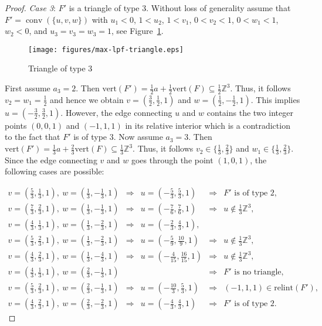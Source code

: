 \documentclass[a4paper]{article}
\theoremstyle{plain}
\begin{document}
\begin{proof}
\emph{Case 3}: $F'$ is a triangle of type 3.
Without loss of generality assume that $F' =
{{\mathop{\mathrm{{conv}}}}}(\{u,v,w\})$ with $u_1 < 0$, $1 < u_2$, $1 < v_1$, $0 <
v_2 < 1$, $0 < w_1 < 1$, $w_2 < 0$, and $u_3 = v_3 = w_3 =
1$, see Figure~\ref{fig.mlpf.tria}.
\begin{figure}[ht]
  \centering
  \texttt{[image: figures/max-lpf-triangle.eps]}
  \caption{Triangle of type $3$}
  \label{fig.mlpf.tria}
\end{figure}
First assume $a_3 = 2$.
Then ${\mathrm{vert}}(F') = \frac{1}{2}a + \frac{1}{2}{\mathrm{vert}}(F)
\subseteq \frac{1}{2} {\mathbb{Z}}^3$.
Thus, it follows $v_2 = w_1 = \frac{1}{2}$ and hence we
obtain $v = (\frac{3}{2},\frac{1}{2},1)$ and $w =
(\frac{1}{2},-\frac{1}{2},1)$.
This implies $u = (-\frac{3}{2},\frac{3}{2},1)$.
However, the edge connecting $u$ and $w$ contains the two
integer points $(0,0,1)$ and $(-1,1,1)$ in its relative
interior which is a contradiction to the fact that $F'$ is
of type $3$.
Now assume $a_3 = 3$.
Then ${\mathrm{vert}}(F') = \frac{1}{3}a + \frac{2}{3}{\mathrm{vert}}(F)
\subseteq \frac{1}{3} {\mathbb{Z}}^3$.
Thus, it follows $v_2 \in \{\frac{1}{3},\frac{2}{3}\}$ and
$w_1 \in \{\frac{1}{3},\frac{2}{3}\}$.
Since the edge connecting $v$ and $w$ goes through the point
$(1,0,1)$, the following cases are possible:
\medskip

$ \begin{array}{lllll}
  v = (\frac{5}{3},\frac{1}{3},1),\ w = (\frac{1}{3},-\frac{1}{3},1)
  & \Longrightarrow & u = (-\frac{5}{3},\frac{5}{3},1)
  & \Longrightarrow & F' \mbox{ is of type 2}, \\[2mm]
  v = (\frac{7}{3},\frac{2}{3},1),\ w = (\frac{1}{3},-\frac{1}{3},1)
  & \Longrightarrow & u = (-\frac{7}{6},\frac{7}{6},1)
  & \Longrightarrow & u \not \in \frac{1}{3} {\mathbb{Z}}^3, \\[2mm]
  v = (\frac{4}{3},\frac{1}{3},1),\ w = (\frac{1}{3},-\frac{2}{3},1)
  & \Longrightarrow & u = (-\frac{2}{3},\frac{4}{3},1),
  & & \\[2mm]
  v = (\frac{5}{3},\frac{2}{3},1),\ w = (\frac{1}{3},-\frac{2}{3},1)
  & \Longrightarrow & u = (-\frac{5}{9},\frac{10}{9},1)
  & \Longrightarrow & u \not \in \frac{1}{3} {\mathbb{Z}}^3, \\[2mm]
  v = (\frac{4}{3},\frac{2}{3},1),\ w = (\frac{1}{3},-\frac{4}{3},1)
  & \Longrightarrow & u = (-\frac{4}{15},\frac{16}{15},1)
  & \Longrightarrow & u \not \in \frac{1}{3} {\mathbb{Z}}^3, \\[2mm]
  v = (\frac{4}{3},\frac{1}{3},1),\ w = (\frac{2}{3},-\frac{1}{3},1)
  & & & \Longrightarrow & F' \mbox{ is no triangle}, \\[2mm]
  v = (\frac{5}{3},\frac{2}{3},1),\ w = (\frac{2}{3},-\frac{1}{3},1)
  & \Longrightarrow & u = (-\frac{10}{3},\frac{5}{3},1)
  & \Longrightarrow & (-1,1,1) \in {\mathrm{relint}}(F'), \\[2mm]
  v = (\frac{4}{3},\frac{2}{3},1),\ w = (\frac{2}{3},-\frac{2}{3},1)
  & \Longrightarrow & u = (-\frac{4}{3},\frac{4}{3},1)
  & \Longrightarrow & F' \mbox{ is of type 2}.
\end{array} $
\medskip


\end{proof}
\end{document}
